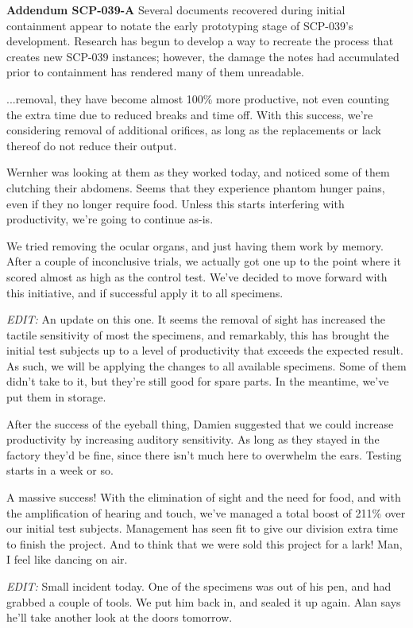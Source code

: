 \textbf{Addendum SCP-039-A} Several documents recovered during initial containment appear to notate the early prototyping stage of SCP-039's development. Research has begun to develop a way to recreate the process that creates new SCP-039 instances; however, the damage the notes had accumulated prior to containment has rendered many of them unreadable.
\newpage
\begin{leftbar}
...removal, they have become almost 100\% more productive, not even counting the extra time due to reduced breaks and time off. With this success, we're considering removal of additional orifices, as long as the replacements or lack thereof do not reduce their output.

Wernher was looking at them as they worked today, and noticed some of them clutching their abdomens. Seems that they experience phantom hunger pains, even if they no longer require food. Unless this starts interfering with productivity, we're going to continue as-is.
\end{leftbar}
\begin{leftbar}
We tried removing the ocular organs, and just having them work by memory. After a couple of inconclusive trials, we actually got one up to the point where it scored almost as high as the control test. We've decided to move forward with this initiative, and if successful apply it to all specimens.

\textsl{EDIT:} An update on this one. It seems the removal of sight has increased the tactile sensitivity of most the specimens, and remarkably, this has brought the initial test subjects up to a level of productivity that exceeds the expected result. As such, we will be applying the changes to all available specimens. Some of them didn't take to it, but they're still good for spare parts. In the meantime, we've put them in storage.
\end{leftbar}
\begin{leftbar}
After the success of the eyeball thing, Damien suggested that we could increase productivity by increasing auditory sensitivity. As long as they stayed in the factory they'd be fine, since there isn't much here to overwhelm the ears. Testing starts in a week or so.
\end{leftbar}
\begin{leftbar}
A massive success! With the elimination of sight and the need for food, and with the amplification of hearing and touch, we've managed a total boost of 211\% over our initial test subjects. Management has seen fit to give our division extra time to finish the project. And to think that we were sold this project for a lark! Man, I feel like dancing on air.

\textsl{EDIT:} Small incident today. One of the specimens was out of his pen, and had grabbed a couple of tools. We put him back in, and sealed it up again. Alan says he'll take another look at the doors tomorrow.
\end{leftbar}